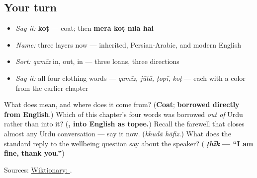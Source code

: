 \subsection*{Your turn}
\begin{itemize}
\raggedright
  \item \emph{Say it:} \textbf{koṭ} — coat; then \textbf{merā koṭ nīlā hai}
  \item \emph{Name:} three layers now — inherited, Persian-Arabic, and modern English
  \item \emph{Sort:} \emph{qamīz} in, \textbf{} out, \textbf{} in — three loans, three directions
  \item \emph{Say it:} all four clothing words — \emph{qamīz, jūtā, ṭopī, koṭ} — each with a color from the earlier chapter
\end{itemize}

\begin{tcolorbox}[breakable,colback=teal!4,colframe=teal!35!black,title={Before you move on}]
What does \textbf{} mean, and where does it come from? (\textbf{Coat}; \textbf{borrowed directly from English}.) Which of this chapter's four words was borrowed \emph{out of} Urdu rather than into it? (\textbf{, into English as topee.}) Recall the farewell that closes almost any Urdu conversation — say it now. (\emph{khudā hāfiz.}) What does the standard reply to the wellbeing question say about the speaker? (\textbf{ \emph{ṭhīk}   — \textquotedblleft{}I am fine, thank you.\textquotedblright{}})

Sources: \href{https://en.wiktionary.org/wiki/\%DA\%A9\%D9\%88\%D9\%B9}{Wiktionary: }.
\end{tcolorbox}
